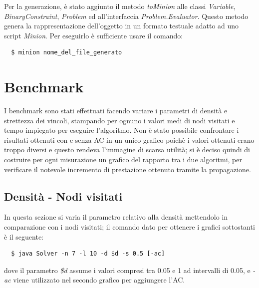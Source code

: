 \documentclass[a4paper,12pt,italian]{article}
\begin{document}
Per la generazione, \`e stato aggiunto il metodo \textit{toMinion}
alle classi \textit{Variable}, \textit{BinaryConstraint},
\textit{Problem} ed all'interfaccia \textit{Problem.Evaluator}. Questo
metodo genera la rappresentazione dell'oggetto in un formato testuale
adatto ad uno script \textit{Minion}. Per eseguirlo \`e sufficiente
usare il comando:

\begin{verbatim}
  $ minion nome_del_file_generato
\end{verbatim}

\section{Benchmark}
I benchmark sono stati effettuati facendo variare i parametri di densit\`a e strettezza
dei vincoli, stampando per ognuno i valori medi di nodi visitati e tempo
impiegato per eseguire l'algoritmo. Non \`e stato possibile confrontare i risultati
ottenuti con e senza AC in un unico grafico poich\`e i valori ottenuti erano troppo
diversi e questo rendeva l'immagine di scarsa utilit\`a; si \`e deciso quindi di costruire 
per ogni misurazione un grafico del rapporto tra i due algoritmi, per verificare il notevole 
incremento di prestazione ottenuto tramite la propagazione.

\subsection{Densit\`a - Nodi visitati}
In questa sezione si varia il parametro relativo alla densit\`a mettendolo
in comparazione con i nodi visitati; il comando dato per ottenere i grafici sottostanti
\`e il seguente:
\begin{verbatim}
  $ java Solver -n 7 -l 10 -d $d -s 0.5 [-ac]
\end{verbatim}
dove il parametro \textit{\$d} assume i valori compresi tra 0.05 e 1 ad intervalli di 0.05,
e \textit{-ac} viene utilizzato nel secondo grafico per aggiungere l'AC.
\end{document}
